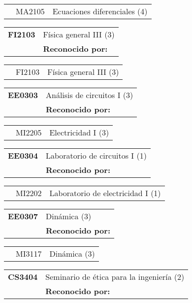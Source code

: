 \documentclass[letterpaper]{article}%
\begin{document}
\begin{tabularx}{\textwidth}{p{1.5cm}p{1.5cm}p{10cm}}%
&MA2105&Ecuaciones diferenciales (4)\\%
\end{tabularx}%
\begin{tabularx}{\textwidth}{p{1.5cm}p{10cm}}%
\textbf{FI2103}&Física general III (3)\\%
&\textbf{Reconocido por: }\\%
\end{tabularx}%
\begin{tabularx}{\textwidth}{p{1.5cm}p{1.5cm}p{10cm}}%
&FI2103&Física general III (3)\\%
\end{tabularx}%
\begin{tabularx}{\textwidth}{p{1.5cm}p{10cm}}%
\textbf{EE0303}&Análisis de circuitos I (3)\\%
&\textbf{Reconocido por: }\\%
\end{tabularx}%
\begin{tabularx}{\textwidth}{p{1.5cm}p{1.5cm}p{10cm}}%
&MI2205&Electricidad I (3)\\%
\end{tabularx}%
\begin{tabularx}{\textwidth}{p{1.5cm}p{10cm}}%
\textbf{EE0304}&Laboratorio de circuitos I (1)\\%
&\textbf{Reconocido por: }\\%
\end{tabularx}%
\begin{tabularx}{\textwidth}{p{1.5cm}p{1.5cm}p{10cm}}%
&MI2202&Laboratorio de electricidad I (1)\\%
\end{tabularx}%
\begin{tabularx}{\textwidth}{p{1.5cm}p{10cm}}%
\textbf{EE0307}&Dinámica (3)\\%
&\textbf{Reconocido por: }\\%
\end{tabularx}%
\begin{tabularx}{\textwidth}{p{1.5cm}p{1.5cm}p{10cm}}%
&MI3117&Dinámica (3)\\%
\end{tabularx}%
\begin{tabularx}{\textwidth}{p{1.5cm}p{10cm}}%
\textbf{CS3404}&Seminario de ética para la ingeniería (2)\\%
&\textbf{Reconocido por: }\\%
\end{tabularx}%
\end{document}
